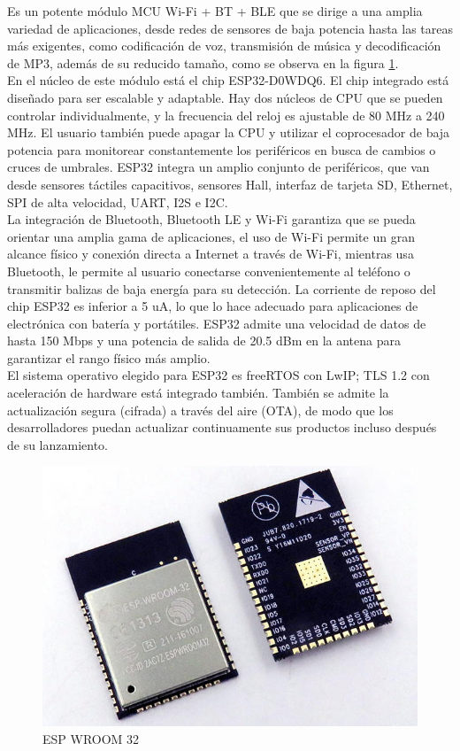 Es un potente módulo MCU Wi-Fi + BT + BLE que se dirige a una amplia variedad de aplicaciones, desde redes de sensores de baja potencia hasta las tareas más exigentes, como codificación de voz, transmisión de música y decodificación de MP3, además de su reducido tamaño, como se observa en la figura \ref{fig:esp32-wroom-s32-00}.\\

En el núcleo de este módulo está el chip ESP32-D0WDQ6. El chip integrado está diseñado para ser escalable y adaptable. Hay dos núcleos de CPU que se pueden controlar individualmente, y la frecuencia del reloj es ajustable de 80 MHz a 240 MHz. El usuario también puede apagar la CPU y utilizar el coprocesador de baja potencia para monitorear constantemente los periféricos en busca de cambios o cruces de umbrales. ESP32 integra un amplio conjunto de periféricos, que van desde sensores táctiles capacitivos, sensores Hall, interfaz de tarjeta SD, Ethernet, SPI de alta velocidad, UART, I2S e I2C.\\

La integración de Bluetooth, Bluetooth LE y Wi-Fi garantiza que se pueda orientar una amplia gama de aplicaciones, el uso de Wi-Fi permite un gran alcance físico y conexión directa a Internet a través de Wi-Fi, mientras usa Bluetooth, le permite al usuario conectarse convenientemente al teléfono o transmitir balizas de baja energía para su detección. La corriente de reposo del chip ESP32 es inferior a 5 uA, lo que lo hace adecuado para aplicaciones de electrónica con batería y portátiles. ESP32 admite una velocidad de datos de hasta 150 Mbps y una potencia de salida de 20.5 dBm en la antena para garantizar el rango físico más amplio.\\

El sistema operativo elegido para ESP32 es freeRTOS con LwIP; TLS 1.2 con aceleración de hardware está integrado también. También se admite la actualización segura (cifrada) a través del aire (OTA), de modo que los desarrolladores puedan actualizar continuamente sus productos incluso después de su lanzamiento.\cite{EW32}

\begin{figure}[H]
	\centering
	\caption{ESP WROOM 32\cite{ESPIMG}}
	\label{fig:esp32-wroom-s32-00}
	\includegraphics{Imagenes/esp32-wroom-s32-00}
\end{figure}

